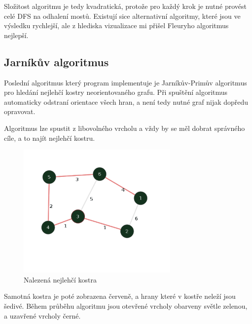 \documentclass{article}
\begin{document}
Složitost algoritmu je tedy kvadratická, protože pro každý krok je nutné
provést celé DFS na odhalení mostů. Existují sice alternativní
algoritmy, které jsou ve výsledku rychlejší, ale z hlediska vizualizace mi přišel
Fleuryho algoritmus nejlepší.

\pagebreak

\subsection{Jarníkův algoritmus}

Poslední algoritmus který program implementuje je Jarníkův-Primův algoritmus
pro hledání nejlehčí kostry neorientovaného grafu. Při spuštění algoritmus automaticky
odstraní orientace všech hran, a není tedy nutné graf nijak dopředu opravovat.

Algoritmus lze spustit z libovolného vrcholu a vždy by se měl dobrat správného cíle,
a to najít nejlehčí kostru.

\begin{figure}[!h]
	\centering
	\includegraphics[width=0.7\textwidth]{kostra.png}
	\caption{Nalezená nejlehčí kostra}
\end{figure}

Samotná kostra je poté zobrazena červeně, a hrany které v kostře neleží jsou šedivé. Během průběhu
algoritmu jsou otevřené vrcholy obarveny světle zelenou, a uzavřené vrcholy černé.
\end{document}
